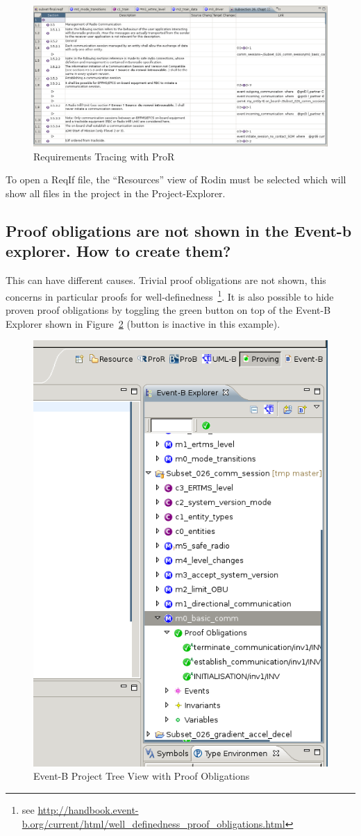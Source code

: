 \documentclass[10pt,a4paper]{article}
\begin{document}
\begin{figure}[H]
  \centering
  \includegraphics[width=\textwidth]{ReqIfinRodin}
  \caption{Requirements Tracing with ProR}
  \label{fig:req-tracing}
\end{figure}

To open a ReqIf file, the ``Resources'' view of Rodin must be selected which
will show all files in the project in the Project-Explorer.

\subsection{Proof obligations are not shown in the Event-b explorer. How to
  create them?}
\label{sec:proof-oblig-are}


This can have different causes. Trivial proof obligations are not shown, this
concerns in particular proofs for well-definedness~\footnote{see
  \url{http://handbook.event-b.org/current/html/well_definedness_proof_obligations.html}}. It
is also possible to hide proven proof obligations by toggling the green button
on top of the Event-B Explorer shown in
Figure~\ref{fig:tree-proof-obligations} (button is inactive in this example).

\begin{figure}[H]
  \centering
  \includegraphics[width=.5\textwidth]{RodinEventBView}
  \caption{Event-B Project Tree View with Proof Obligations}
  \label{fig:tree-proof-obligations}
\end{figure}
\end{document}
